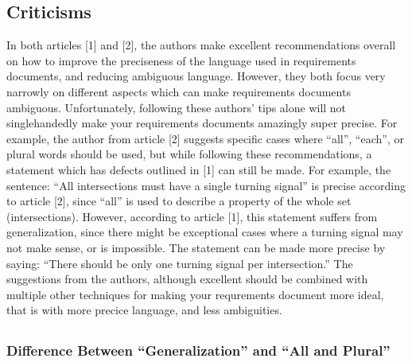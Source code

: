 \documentclass[letterpaper,12pt]{article}
\begin{document}
\subsection{Criticisms} %
In both articles [1] and [2], the authors make excellent recommendations overall
on how to improve the preciseness of the language used in requirements
documents, and reducing ambiguous language. However, they both focus very
narrowly on different aspects which can make requirements documents ambiguous.
Unfortunately, following these authors' tips alone will not singlehandedly make
your requirements documents amazingly super precise. For example, the author
from article [2] suggests specific cases where ``all'', ``each'', or plural
words should be used, but while following these recommendations, a statement
which has defects outlined in [1] can still be made. For example, the sentence:
``All intersections must have a single turning signal'' is precise according to
article [2], since ``all'' is used to describe a property of the whole set
(intersections). However, according to article [1], this statement suffers from
generalization, since there might be exceptional cases where a turning signal
may not make sense, or is impossible. The statement can be made more precise by
saying: ``There should be only one turning signal per intersection.'' The
suggestions from the authors, although excellent should be combined with
multiple other techniques for making your requrements document more ideal, that
is with more precice language, and less ambiguities.

\subsection{}

\subsubsection{Difference Between ``Generalization'' and ``All and Plural''}
\end{document}
